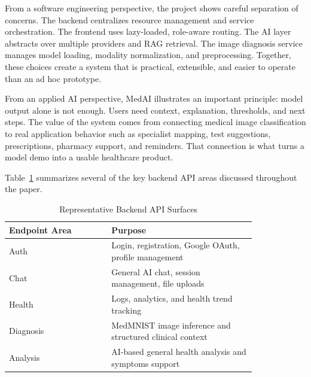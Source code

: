\documentclass[conference]{IEEEtran}
\begin{document}
From a software engineering perspective, the project shows careful separation of concerns. The backend centralizes resource management and service orchestration. The frontend uses lazy-loaded, role-aware routing. The AI layer abstracts over multiple providers and RAG retrieval. The image diagnosis service manages model loading, modality normalization, and preprocessing. Together, these choices create a system that is practical, extensible, and easier to operate than an ad hoc prototype.

From an applied AI perspective, MedAI illustrates an important principle: model output alone is not enough. Users need context, explanation, thresholds, and next steps. The value of the system comes from connecting medical image classification to real application behavior such as specialist mapping, test suggestions, prescriptions, pharmacy support, and reminders. That connection is what turns a model demo into a usable healthcare product.

Table~\ref{tab:api} summarizes several of the key backend API areas discussed throughout the paper.

\begin{table}[H]
\centering
\caption{Representative Backend API Surfaces}
\label{tab:api}
\begin{tabular}{p{0.34\linewidth} p{0.48\linewidth}}
\toprule
\textbf{Endpoint Area} & \textbf{Purpose} \\
\midrule
Auth & Login, registration, Google OAuth, profile management \\
Chat & General AI chat, session management, file uploads \\
Health & Logs, analytics, and health trend tracking \\
Diagnosis & MedMNIST image inference and structured clinical context \\
Analysis & AI-based general health analysis and symptoms support \\
\bottomrule
\end{tabular}
\end{table}
\end{document}
